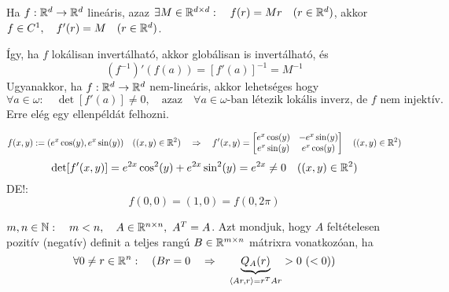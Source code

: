 \documentclass[a4paper,11.5pt]{article}
\begin{document}
	\begin{note}
		Ha $f:\mathbb{R}^d\to\mathbb{R}^d$ lineáris, azaz $\exists M\in\mathbb{R}^{d\times d}:\quad f(r)=Mr\quad (r\in\mathbb{R}^d)$, akkor $f\in C^1,\quad f'(r)=M\quad (r\in\mathbb{R}^d)$.
		
		Így, ha $f$ lokálisan invertálható, akkor globálisan is invertálható, és
		\[ (f^{-1})'(f(a))=[f'(a)]^{-1}=M^{-1} \]
		Ugyanakkor, ha $f:\mathbb{R}^d\to\mathbb{R}^d$ nem-lineáris, akkor lehetséges hogy $ \forall a\in\omega:\quad \det[f'(a)]\not=0,\quad \text{azaz}\quad \forall a\in\omega\text{-ban létezik lokális inverz, de $f$ nem injektív.}$ Erre elég egy ellenpéldát felhozni.
		\begin{example}
			\[ f(x,y):=(e^x\cos(y),e^x\sin(y))\quad ((x,y)\in\mathbb{R}^2)\quad \Rightarrow\quad f'(x,y)=\begin{bmatrix}
				e^x\cos(y)&-e^x\sin(y)\\
				e^x\sin(y)&e^x\cos(y)
			\end{bmatrix}\quad ((x,y)\in\mathbb{R}^2) \]
		\[ \det[f'(x,y)]=e^{2x}\cos^2(y)+e^{2x}\sin^2(y)=e^{2x}\not=0\quad ((x,y)\in\mathbb{R}^2) \]
		DE!:
		\[ f(0,0)=(1,0)=f(0,2\pi) \]
		\end{example}
	\end{note}
	\begin{definition}
		$m,n\in\mathbb{N}:\quad m<n,\quad A\in\mathbb{R}^{n\times n},\ A^T=A$. Azt mondjuk, hogy $A$ feltételesen pozitív (negatív) definit a teljes rangú $B\in\mathbb{R}^{m\times n}$ mátrixra vonatkozóan, ha
		\[ \forall 0\not=r\in\R^n:\quad (Br=0\quad \Rightarrow\quad \underbrace{Q_A(r)}_{\langle Ar,r\rangle=r^TAr}>0\ (<0)) \]
	\end{definition}
\end{document}
